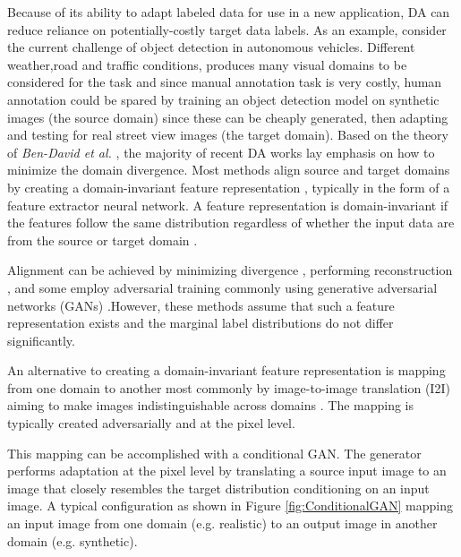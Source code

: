 \documentclass[10pt,twocolumn,letterpaper]{article}
\begin{document}
Because of its ability to adapt labeled data for use in a new application, DA can reduce reliance on potentially-costly target data labels. As an example, consider the current challenge of object detection in autonomous vehicles. Different weather,road and traffic conditions,  produces many visual domains to be considered for the task \cite{shan2019pixel} and since manual annotation task is very costly, human annotation could be spared by training an object detection model on synthetic images (the source domain) since these can be cheaply generated, then adapting and testing for real street view images (the target domain).
Based on the theory of {\it Ben-David et al.} \cite{36364}, the majority of recent DA works \cite{long2018conditional} lay emphasis on how to minimize the domain divergence. Most methods align source and target domains by creating a domain-invariant feature representation \cite{bousmalis2017using, 36364, 8578386}, typically in the form of a feature extractor neural network. A feature representation is domain-invariant if the features follow the same distribution regardless of whether the input data are from the source or target domain \cite{zhao2019learning}.

Alignment can be achieved by minimizing divergence \cite{gretton2008kernel, JMLR:v13:gretton12a}, performing reconstruction \cite{ghifary2016deep}, and some employ adversarial training commonly using generative adversarial networks (GANs) \cite{ganin2016domainadversarial, ganin2015unsupervised}.However, these methods assume that such a feature representation exists and the marginal label distributions do not differ significantly.


An alternative to creating a domain-invariant feature representation is mapping from one domain to another most commonly by image-to-image translation (I2I) aiming to make images indistinguishable across domains \cite{choi2018stargan,lee2018diverse,liu2018unsupervised,CGAN}. The mapping is typically created adversarially and at the pixel level.

This mapping can be accomplished with a conditional GAN. The generator performs adaptation at the pixel level by translating a source input image to an image that closely resembles the target distribution \cite{denton2015deep, goodfellow2014generative, mirza2014conditional} conditioning on an input image. A typical configuration as shown in Figure \ref{fig:ConditionalGAN} mapping an input image from one domain (e.g. realistic) to an output image in another domain (e.g. synthetic). 
\end{document}
